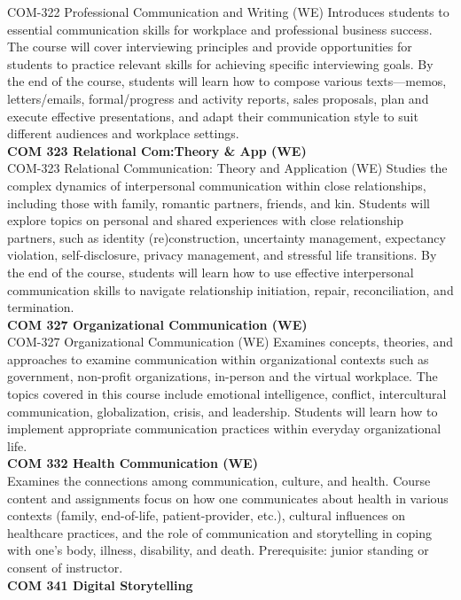 \documentclass[
  letterpaper,
]{scrbook}
\begin{document}
COM-322 Professional Communication and Writing (WE) Introduces students
to essential communication skills for workplace and professional
business success. The course will cover interviewing principles and
provide opportunities for students to practice relevant skills for
achieving specific interviewing goals. By the end of the course,
students will learn how to compose various texts---memos,
letters/emails, formal/progress and activity reports, sales proposals,
plan and execute effective presentations, and adapt their communication
style to suit different audiences and workplace settings.\\
\textbf{COM 323 Relational Com:Theory \& App (WE)}\\
COM-323 Relational Communication: Theory and Application (WE) Studies
the complex dynamics of interpersonal communication within close
relationships, including those with family, romantic partners, friends,
and kin. Students will explore topics on personal and shared experiences
with close relationship partners, such as identity (re)construction,
uncertainty management, expectancy violation, self-disclosure, privacy
management, and stressful life transitions. By the end of the course,
students will learn how to use effective interpersonal communication
skills to navigate relationship initiation, repair, reconciliation, and
termination.\\
\textbf{COM 327 Organizational Communication (WE)}\\
COM-327 Organizational Communication (WE) Examines concepts, theories,
and approaches to examine communication within organizational contexts
such as government, non-profit organizations, in-person and the virtual
workplace. The topics covered in this course include emotional
intelligence, conflict, intercultural communication, globalization,
crisis, and leadership. Students will learn how to implement appropriate
communication practices within everyday organizational life.\\
\textbf{COM 332 Health Communication (WE)}\\
Examines the connections among communication, culture, and health.
Course content and assignments focus on how one communicates about
health in various contexts (family, end-of-life, patient-provider,
etc.), cultural influences on healthcare practices, and the role of
communication and storytelling in coping with one's body, illness,
disability, and death. Prerequisite: junior standing or consent of
instructor.\\
\textbf{COM 341 Digital Storytelling}\\
\end{document}
